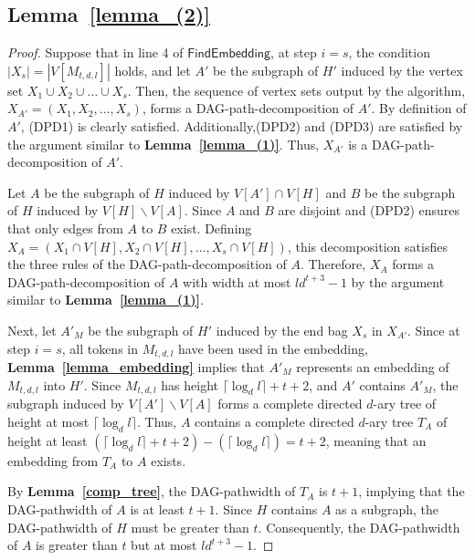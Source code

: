 \documentclass[runningheads]{llncs}
\theoremstyle{plain}
\theoremstyle{definition}
\begin{document}
\subsection{\textbf{Lemma~\ref{lemma_(2)}}}\label{appendix_D5}
\begin{proof}
    Suppose that in line 4 of $\mathsf{FindEmbedding}$, at step $i=s$, the condition $|X_s| = |V[M_{t, d, l}]|$ holds, and let $A'$ be the subgraph of $H'$ induced by the vertex set $X_1 \cup X_2 \cup \dots \cup X_s$. Then, the sequence of vertex sets output by the algorithm, $X_{A'} = (X_1, X_2, \dots , X_s)$, forms a DAG-path-decomposition of $A'$. By definition of $A'$, (DPD1) is clearly satisfied. Additionally,(DPD2) and (DPD3) are satisfied by the argument similar to \textbf{Lemma~\ref{lemma_(1)}}. Thus, $X_{A'}$ is a DAG-path-decomposition of $A'$.

    Let $A$ be the subgraph of $H$ induced by $V[A'] \cap V[H]$ and $B$ be the subgraph of $H$ induced by $V[H] \backslash V[A]$. Since $A$ and $B$ are disjoint and (DPD2) ensures that only edges from $A$ to $B$ exist. Defining $X_A = (X_1 \cap V[H], X_2 \cap V[H], \dots , X_s \cap V[H])$, this decomposition satisfies the three rules of the DAG-path-decomposition of $A$. Therefore, $X_A$ forms a DAG-path-decomposition of $A$ with width at most $ld^{t+3}-1$ by the argument similar to \textbf{Lemma~\ref{lemma_(1)}}.

    Next, let $A'_M$ be the subgraph of $H'$ induced by the end bag $X_s$ in $X_{A'}$. Since at step $i=s$, all tokens in $M_{t, d, l}$ have been used in the embedding, \textbf{Lemma~\ref{lemma_embedding}} implies that $A'_M$ represents an embedding of $M_{t, d, l}$ into $H'$. Since $M_{t, d, l}$ has height $\lceil \log_d l \rceil +t+2$, and $A'$ contains $A'_M$, the subgraph induced by $V[A'] \backslash V[A]$ forms a complete directed $d$-ary tree of height at most $\lceil \log_d l \rceil$. Thus, $A$ contains a complete directed $d$-ary tree $T_A$ of height at least $(\lceil \log_d l \rceil +t+2) - (\lceil \log_d l \rceil) = t+2$, meaning that an embedding from $T_A$ to $A$ exists. 

    By \textbf{Lemma~\ref{comp_tree}}, the DAG-pathwidth of $T_A$ is $t+1$, implying that the DAG-pathwidth of $A$ is at least $t+1$. Since $H$ contains $A$ as a subgraph, the DAG-pathwidth of $H$ must be greater than $t$. Consequently, the DAG-pathwidth of $A$ is greater than $t$ but at most $ld^{t+3}-1$.
\end{proof}
\end{document}
